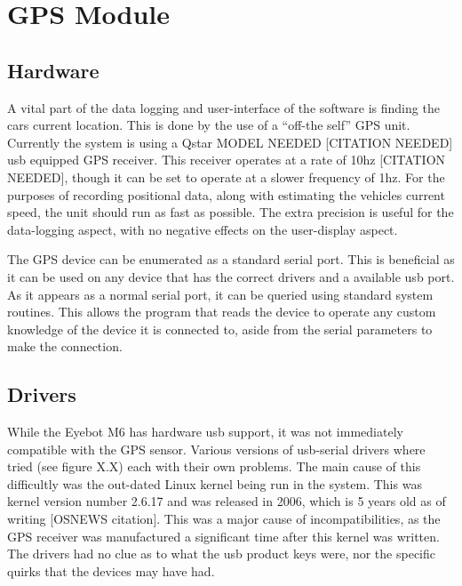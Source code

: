 

\section{GPS Module}

\subsection{Hardware}

A vital part of the data logging and user-interface of the software is finding the cars current location. This is done by the use of a “off-the self” GPS unit. Currently the system is using a Qstar MODEL NEEDED [CITATION NEEDED] usb equipped GPS receiver. This receiver operates at a rate of 10hz [CITATION NEEDED], though it can be set to operate at a slower frequency of 1hz. For the purposes of recording positional data, along with estimating the vehicles current speed, the unit should run as fast as possible. The extra precision is useful for the data-logging aspect, with no negative effects on the user-display aspect.  

The GPS device can be enumerated as a standard serial port. This is beneficial as it can be used on any device that has the correct drivers and a available usb port. As it appears as a normal serial port, it can be queried using standard system routines. This allows the program that reads the device to operate any custom knowledge of the device it is connected to, aside from the serial parameters to make the connection. 

\subsection{ Drivers}
\label{sec:gpsdrivers}

While the Eyebot M6 has hardware usb support, it was not immediately compatible with the GPS sensor. Various versions of usb-serial drivers where tried (see figure X.X) each with their own problems. The main cause of this difficultly was the out-dated Linux kernel being run in the system. This was kernel version number 2.6.17 and was released in 2006, which is 5 years old as of writing [OSNEWS citation]. This was a major cause of incompatibilities, as the GPS receiver was manufactured a significant time after this kernel was written. The drivers had no clue as to what the usb product keys were, nor the specific quirks that the devices may have had.

